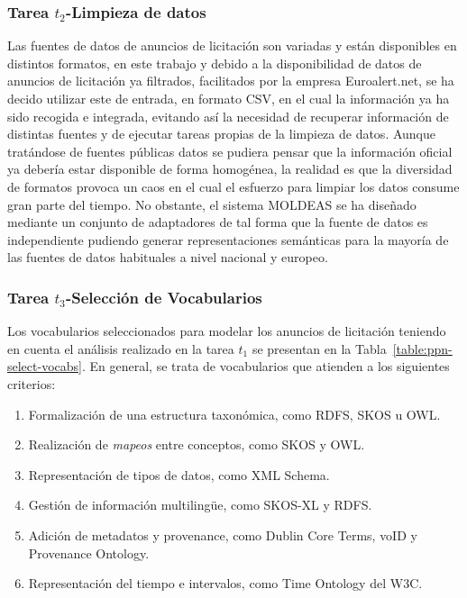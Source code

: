 \subsubsection{Tarea $t_2$-Limpieza de datos}
Las fuentes de datos de anuncios de licitación son variadas y están disponibles en distintos formatos, en este 
trabajo y debido a la disponibilidad de datos de anuncios de licitación ya filtrados, facilitados por la 
empresa Euroalert.net, se ha decido utilizar este \dataset de entrada, en formato \gls{CSV}, en el cual la información ya ha sido 
recogida e integrada, evitando así la necesidad de recuperar información de distintas fuentes y de ejecutar 
tareas propias de la limpieza de datos. Aunque tratándose de fuentes públicas datos se pudiera pensar 
que la información oficial ya debería estar disponible de forma homogénea, la realidad es que la diversidad 
de formatos provoca un caos en el cual el esfuerzo para limpiar los datos consume gran parte del tiempo. No obstante, 
el sistema \gls{MOLDEAS} se ha diseñado mediante un conjunto de adaptadores de tal forma que la fuente de datos es independiente 
pudiendo generar representaciones semánticas para la mayoría de las fuentes de datos habituales a nivel nacional y 
europeo.

\subsubsection{Tarea $t_3$-Selección de Vocabularios}
Los vocabularios seleccionados para modelar los anuncios de licitación teniendo en cuenta el análisis 
 realizado en la tarea $t_1$ se presentan en la Tabla~\ref{table:ppn-select-vocabs}. En general, se trata de vocabularios 
 que atienden a los siguientes criterios:
% 
\begin{enumerate}
  \item Formalización de una estructura taxonómica, como RDFS, \gls{SKOS} u \gls{OWL}.
  \item Realización de \textit{mapeos} entre conceptos, como SKOS y OWL.
  \item Representación de tipos de datos, como \gls{XML Schema}.
  \item Gestión de información multiling\"{u}e, como \gls{SKOS-XL} y RDFS.
  \item Adición de metadatos y provenance, como Dublin Core Terms, \gls{voID} y Provenance Ontology.
  \item Representación del tiempo e intervalos, como Time Ontology del \gls{W3C}.
 \end{enumerate}


